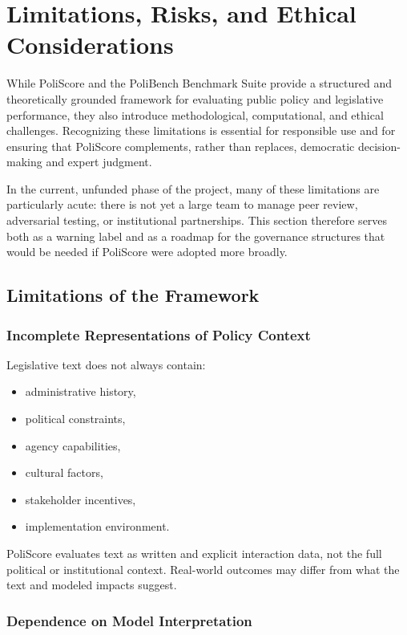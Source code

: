 \documentclass[12pt]{article}
\begin{document}
\section{Limitations, Risks, and Ethical Considerations}
\label{sec:limitations}

While PoliScore and the PoliBench Benchmark Suite provide a structured and theoretically grounded framework for evaluating
public policy and legislative performance, they also introduce methodological, computational, and ethical challenges.
Recognizing these limitations is essential for responsible use and for ensuring that PoliScore complements, rather than
replaces, democratic decision-making and expert judgment.

In the current, unfunded phase of the project, many of these limitations are particularly acute: there is not yet a large
team to manage peer review, adversarial testing, or institutional partnerships. This section therefore serves both as a
warning label and as a roadmap for the governance structures that would be needed if PoliScore were adopted more broadly.

\subsection{Limitations of the Framework}

\subsubsection{Incomplete Representations of Policy Context}

Legislative text does not always contain:

\begin{itemize}
    \item administrative history,
    \item political constraints,
    \item agency capabilities,
    \item cultural factors,
    \item stakeholder incentives,
    \item implementation environment.
\end{itemize}

PoliScore evaluates text as written and explicit interaction data, not the full political or institutional context.
Real-world outcomes may differ from what the text and modeled impacts suggest.

\subsubsection{Dependence on Model Interpretation}
\end{document}
